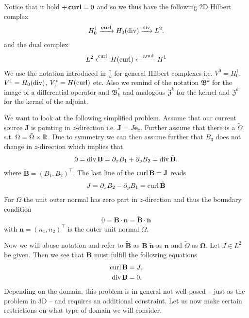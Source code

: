 \documentclass[../master_thesis.tex]{subfiles}
\begin{document}
Notice that it hold $\div \veccurl = 0$ and so 
we thus have the following 2D Hilbert complex 
\begin{align*}
    H^1_0 \xrightarrow{\veccurl} H_0(\diver) \xrightarrow{\diver} L^2.
\end{align*}
and the dual complex
\begin{align*}
    L^2 \xleftarrow{\operatorname{curl}} H(\operatorname{curl}) \xleftarrow{-\operatorname{grad}} H^1
\end{align*}
We use the notation introduced in \ref{} for general Hilbert complexes i.e.
$V^0 = H^1_0$, $V^1= H_0(\operatorname{div})$, $V^*_1 = H(\operatorname{curl})$ etc. Also we remind of 
the notation $\mathfrak{B}^k$ for the image of a differential operator 
and $\mathfrak{B}^*_k$ and analogous $\mathfrak{Z}^k$ for the kernel and 
$\mathfrak{Z}^k$ for the kernel of the adjoint.

We want to look at the following simplified problem. Assume that our current source 
$\mathbf{J}$ is pointing in $z$-direction i.e. $\mathbf{J} = J \mathbf{e}_z$. 
Further assume that there is a $\tilde{\Omega}$ s.t. 
$\Omega = \tilde{\Omega} \times \mathbb{R}$. Due to symmetry we can then assume
further that $B_3$ does not change in $z$-direction which implies that 
\begin{align*}
    0 = \operatorname{div} \mathbf{B} = \partial_x B_1 + \partial_y B_2 = \operatorname{div} \tilde{\mathbf{B}}.
\end{align*}
where $\tilde{\mathbf{B}} = (B_1,B_2)^\top$. The last line of the 
$\operatorname{curl} \mathbf{B} = \mathbf{J}$ reads 
\begin{align*}
    J = \partial_x B_2 - \partial_y B_1 = \operatorname{curl} \tilde{\mathbf{B}}
\end{align*}
For $\Omega$ the unit outer normal has zero part in $z$-direction and thus the boundary 
condition
\begin{align*}
    0 = \mathbf{B} \cdot \mathbf{n} = \tilde{\mathbf{B}} \cdot \tilde{\mathbf{n}}
\end{align*}
with $\tilde{\mathbf{n}} = (n_1, n_2)^\top$ is the outer unit normal 
$\tilde{\Omega}$. 

Now we will abuse notation and refer to $\tilde{\mathbf{B}}$ as $\mathbf{B}$ 
$\tilde{\mathbf{n}}$ as $\mathbf{n}$ and $\tilde{\Omega}$ as $\mathbf{\Omega}$.
Let $J \in L^2$ be given. Then we see that $\mathbf{B}$ must fulfill the 
following equations
\begin{align*}
    \operatorname{curl} \mathbf{B} &= J,
    \\ \operatorname{div} \mathbf{B} &= 0.
\end{align*}
Depending on the domain, this problem is in general not well-posed -- just as the problem in 3D -- 
and requires an additional constraint. Let us now make certain restrictions 
on what type of domain we will consider. 
\end{document}
